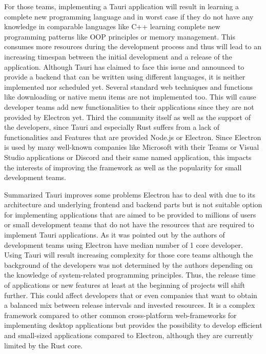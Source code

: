 For those teams, implementing a Tauri application will result in learning a complete new programming language and in worst case if they do not have any knowledge in comparable languages like C++
learning complete new programming patterns like \ac{OOP} principles or memory management.
This consumes more resources during the development process and thus will lead to an increasing timespan between the initial development and a release of the application.
Although Tauri has claimed to face this issue and announced to provide a backend that can be written using different languages, it is neither implemented nor scheduled yet.
Several standard web techniques and functions like downloading or native menu items are not implemented too.
This will cause developer teams add new functionalities to their applications since they are not provided by Electron yet.
Third the community itself as well as the support of the developers, since Tauri and especially Rust suffers from a lack of functionalities and Features that are provided Node.js or Electron.
Since Electron is used by many well-known companies like Microsoft with their Teams or Visual Studio applications or Discord and their same named application,
this impacts the interests of improving the framework as well as the popularity for small development teams.

Summarized Tauri improves some problems Electron has to deal with due to its architecture and underlying frontend and backend parts but is not suitable option for implementing applications
that are aimed to be provided to millions of users or small development teams that do not have the resources that are required to implement Tauri applications.
As it was pointed out by the authors of~\cite{explorationstudy} development teams using Electron have median number of 1 core developer.
Using Tauri will result increasing complexity for those core teams although the background of the developers was not determined by the authors depending on the knowledge of system-related programming principles.
Thus, the release time of applications or new features at least at the beginning of projects will shift further.
This could affect developers that or even companies that want to obtain a balanced mix between release intervals and invested resources.
It is a complex framework compared to other common cross-platform web-frameworks for implementing desktop applications but provides the possibility to develop efficient and small-sized applications compared to Electron, although
they are currently limited by the Rust core.


